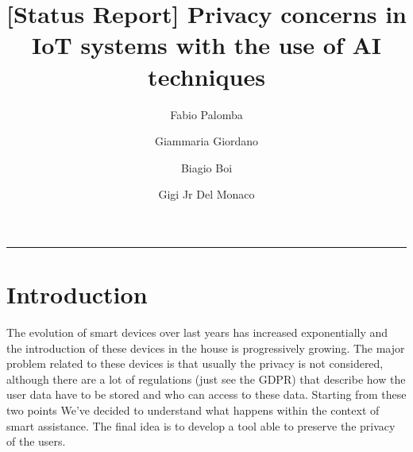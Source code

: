 \documentclass[sigconf]{acmart}
\begin{document}
    \title{[Status Report] Privacy concerns in IoT systems with the use of AI techniques}


    \author{Fabio Palomba}

    \author{Giammaria Giordano}

    \author{Biagio Boi}
    \author{Gigi Jr Del Monaco}

   

    \begin{teaserfigure}
        \rule{\linewidth}{1mm}
    \end{teaserfigure}

    \maketitle


    \section{Introduction}
    The evolution of smart devices over last years has increased exponentially and the introduction of these devices in the house is progressively growing.
    The major problem related to these devices is that usually the privacy is not considered, although there are a lot of regulations (just see the GDPR) that describe how the user data have to be stored and who can access to these data.
    Starting from these two points We've decided to understand what happens within the context of smart assistance. The final idea is to develop a tool able to preserve the privacy of the users.
\end{document}
